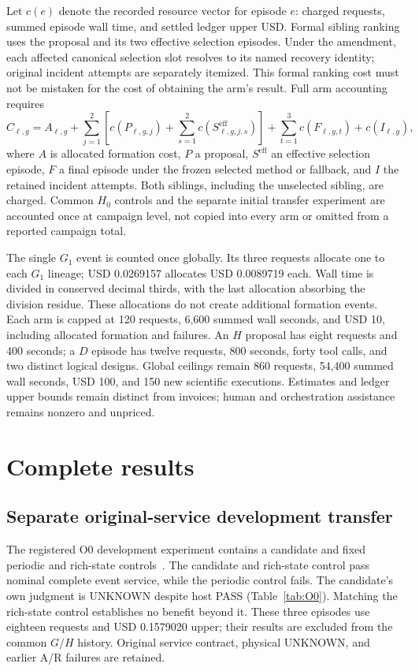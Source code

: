 Let $c(e)$ denote the recorded resource vector for episode $e$: charged
requests, summed episode wall time, and settled ledger upper USD. Formal
sibling ranking uses the proposal and its two effective selection episodes.
Under the amendment, each affected canonical selection slot resolves to its
named recovery identity; original incident attempts are separately itemized.
This formal ranking cost must not be mistaken for the cost of obtaining the
arm's result. Full arm accounting requires
\[
 C_{\ell,g}=A_{\ell,g}
 +\sum_{j=1}^{2}\!\left[c(P_{\ell,g,j})
                   +\sum_{s=1}^{2}c(S^{\mathrm{eff}}_{\ell,g,j,s})\right]
 +\sum_{t=1}^{3}c(F_{\ell,g,t})+c(I_{\ell,g}),
\]
where $A$ is allocated formation cost, $P$ a proposal, $S^{\mathrm{eff}}$
an effective selection episode, $F$ a final episode under the frozen selected
method or fallback, and $I$ the retained incident attempts. Both siblings,
including the unselected sibling, are charged. Common $H_0$ controls and the
separate initial transfer experiment are accounted once at campaign level,
not copied into every arm or omitted from a reported campaign total.

The single $G_1$ event is counted once globally. Its three requests allocate
one to each $G_1$ lineage; USD 0.0269157 allocates USD 0.0089719 each. Wall time
is divided in conserved decimal thirds, with the last allocation absorbing
the division residue. These allocations do not create additional formation
events. Each arm is capped at 120 requests, 6,600 summed wall seconds, and
USD 10, including allocated formation and failures. An $H$ proposal has eight
requests and 400 seconds; a $D$ episode has twelve requests, 800 seconds,
forty tool calls, and two distinct logical designs. Global ceilings remain
860 requests, 54,400 summed wall seconds, USD 100, and 150 new scientific
executions. Estimates and ledger upper bounds remain distinct from invoices;
human and orchestration assistance remains nonzero and unpriced.

\section{Complete results}

\subsection{Separate original-service development transfer}

The registered O0 development experiment contains a candidate and fixed
periodic and rich-state controls~\cite{O0}. The candidate and rich-state
control pass nominal complete event service, while the periodic control
fails. The candidate's own judgment is UNKNOWN despite host PASS
(Table~\ref{tab:O0}). Matching the rich-state control establishes no benefit
beyond it. These three episodes use eighteen requests and USD 0.1579020
upper; their results are excluded from the common $G/H$ history. Original
service contract, physical UNKNOWN, and earlier A/R failures are retained.

